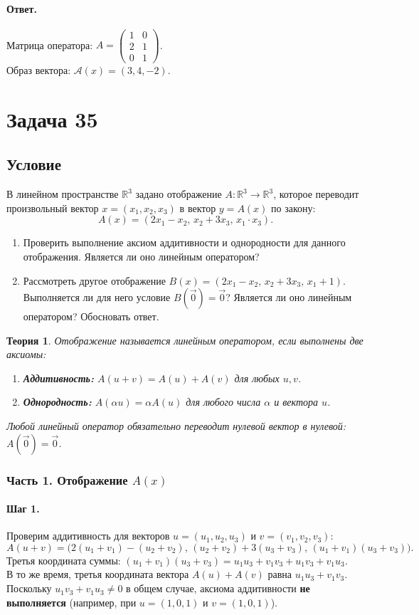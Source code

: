 \documentclass[12pt,a4paper]{article}
\theoremstyle{solution}
\newtheorem*{theory}{Теория}
\newcommand{\task}[1]{\newpage\section*{Задача #1}}
\newcommand{\answer}{\paragraph{Ответ.}}
\newcommand{\step}[1]{\paragraph{Шаг #1.}}
\begin{document}
\answer
Матрица оператора: $A = \begin{pmatrix} 1 & 0 \\ 2 & 1 \\ 0 & 1 \end{pmatrix}$. \\
Образ вектора: $\mathcal{A}(x) = (3, 4, -2)$.

\task{35}
\subsection*{Условие}
В линейном пространстве $\mathbb{R}^3$ задано отображение $A : \mathbb{R}^3 \to \mathbb{R}^3$, которое переводит произвольный вектор $x = (x_1, x_2, x_3)$ в вектор $y = A(x)$ по закону:
\[
A(x) = (2x_1 - x_2,\, x_2 + 3x_3,\, x_1 \cdot x_3).
\]
\begin{enumerate}
    \item Проверить выполнение аксиом аддитивности и однородности для данного отображения. Является ли оно линейным оператором?
    \item Рассмотреть другое отображение $B(x) = (2x_1 - x_2,\, x_2 + 3x_3,\, x_1 + 1)$. Выполняется ли для него условие $B(\vec{0}) = \vec{0}$? Является ли оно линейным оператором? Обосновать ответ.
\end{enumerate}

\begin{theory}
Отображение называется линейным оператором, если выполнены две аксиомы:
\begin{enumerate}
    \item \textbf{Аддитивность:} $A(u + v) = A(u) + A(v)$ для любых $u, v$.
    \item \textbf{Однородность:} $A(\alpha u) = \alpha A(u)$ для любого числа $\alpha$ и вектора $u$.
\end{enumerate}
Любой линейный оператор обязательно переводит нулевой вектор в нулевой: $A(\vec{0}) = \vec{0}$.
\end{theory}

\subsubsection*{Часть 1. Отображение $A(x)$}

\step{1} Проверим аддитивность для векторов $u = (u_1, u_2, u_3)$ и $v = (v_1, v_2, v_3)$:
\[
A(u+v) = \Big(2(u_1+v_1) - (u_2+v_2),\, (u_2+v_2) + 3(u_3+v_3),\, (u_1+v_1)(u_3+v_3)\Big).
\]
Третья координата суммы: $(u_1+v_1)(u_3+v_3) = u_1 u_3 + v_1 v_3 + u_1 v_3 + v_1 u_3$. \\
В то же время, третья координата вектора $A(u) + A(v)$ равна $u_1 u_3 + v_1 v_3$. \\
Поскольку $u_1 v_3 + v_1 u_3 \neq 0$ в общем случае, аксиома аддитивности \textbf{не выполняется} (например, при $u=(1,0,1)$ и $v=(1,0,1)$).
\end{document}
